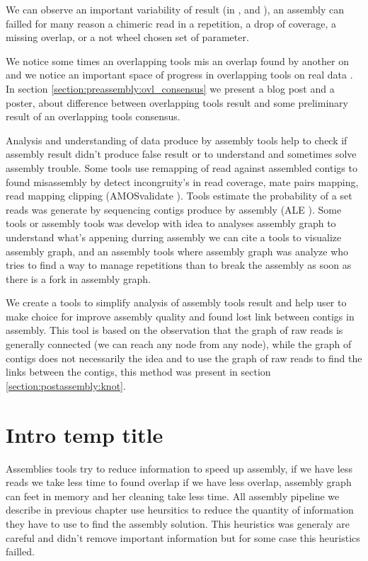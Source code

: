 \documentclass[main.tex]{subfiles}
\begin{document}
We can observe an important variability of result (in \canu, \wtdbg and ), an assembly can failled for many reason a chimeric read in a repetition, a drop of coverage, a missing overlap, or a not wheel chosen set of parameter.

We notice some times an overlapping tools mis an overlap found by another on and we notice an important space of progress in overlapping tools on real data \cite{ovl_bench}. In section \ref{section:preassembly:ovl_consensus} we present a blog post and a poster, about difference between overlapping tools result and some preliminary result of an overlapping tools consensus.


Analysis and understanding of data produce by assembly tools help to check if assembly result didn't produce false result or to understand and sometimes solve assembly trouble. Some tools use remapping of read against assembled contigs to found misassembly by detect incongruity's in read coverage, mate pairs mapping, read mapping clipping (AMOSvalidate \cite{amosvalidate}).
Tools estimate the probability of a set reads was generate by sequencing contigs produce by assembly (ALE \cite{ALE}). 
Some tools or assembly tools was develop with idea to analyses assembly graph to understand what's appening durring assembly we can cite  \cite{bandage} a tools to visualize assembly graph, and \hinge \cite{hinge} an assembly tools where assembly graph was analyze who tries to find a way to manage repetitions than to break the assembly as soon as there is a fork in assembly graph.

We create \knot a tools to simplify analysis of assembly tools result and help user to make choice for improve assembly quality and found lost link between contigs in assembly. This tool is based on the observation that the graph of raw reads is generally connected (we can reach any node from any node), while the graph of contigs does not necessarily the idea and to use the graph of raw reads to find the links between the contigs, this method was present in section \ref{section:postassembly:knot}.

\section{Intro temp title}

Assemblies tools try to reduce information to speed up assembly, if we have less reads we take less time to found overlap if we have less overlap, assembly graph can feet in memory and her cleaning take less time. All assembly pipeline we describe in previous chapter use heursitics to reduce the quantity of information they have to use to find the assembly solution. This heuristics was generaly are careful and didn't remove important information but for some case this heuristics failled.
\end{document}
